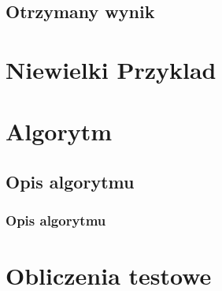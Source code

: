 \documentclass{beamer}
\begin{document}
\subsection{Otrzymany wynik}
\section{Niewielki Przyklad}
\section{Algorytm}
\begin{frame}
\subsection{Opis algorytmu}
\frametitle{Opis algorytmu}
\end{frame}
\section{Obliczenia testowe}
\end{document}
